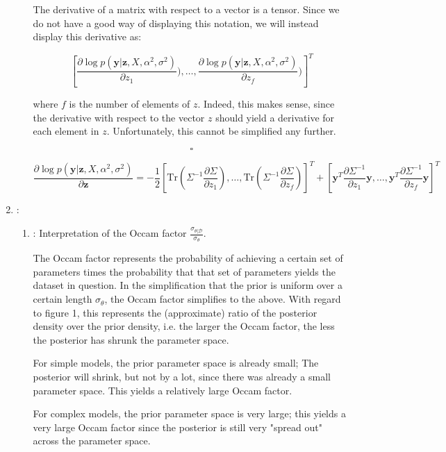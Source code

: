 \documentclass[11pt]{article}
\newcommand{\mbf}[1]{{\boldsymbol{\mathbf{#1}}}}
\renewcommand{\bm}{\mbf}
\newcommand{\Tr}{\textrm{Tr}}
\begin{document}
\begin{enumerate}
\begin{enumerate}[label=(\alph*)]
            The derivative of a matrix with respect to a vector is a tensor. Since we do not have a good way of displaying this notation, we will instead display this derivative as:

            $$
            [\dfrac{\partial \log p(\bm{y}|\bm{z}, X, \alpha^2, \sigma^2)}{\partial z_1}), \dots, \dfrac{\partial \log p(\bm{y}|\bm{z}, X, \alpha^2, \sigma^2)}{\partial z_f})]^T
            $$

            where $f$ is the number of elements of $z$. Indeed, this makes sense, since the derivative with respect to the vector $z$ should yield a derivative for each element in $z$. Unfortunately, this cannot be simplified any further.

            $$\square$$

            $$
            \dfrac{\partial \log p(\bm{y}|\bm{z}, X, \alpha^2, \sigma^2)}{\partial \bm{z}} = - \dfrac{1}{2} [\Tr(\Sigma^{-1} \dfrac{\partial \Sigma}{\partial z_1}), \dots, \Tr(\Sigma^{-1} \dfrac{\partial \Sigma}{\partial z_f})]^T + [\bm{y}^T \dfrac{\partial \Sigma^{-1}}{\partial z_1} \bm{y}, \dots, \bm{y}^T \dfrac{\partial \Sigma^{-1}}{\partial z_f} \bm{y}]^T$$

    \end{enumerate}

    \item:
    \begin{enumerate}[label=(\alph*)]
        \item: Interpretation of the Occam factor $\frac{\sigma_{\theta|\mathcal{D}}}{\sigma_{\theta}}$.

            The Occam factor represents the probability of achieving a certain set of parameters times the probability that that set of parameters yields the dataset in question. In the simplification that the prior is uniform over a certain length $\sigma_{\theta}$, the Occam factor simplifies to the above. With regard to figure 1, this represents the (approximate) ratio of the posterior density over the prior density, i.e. the larger the Occam factor, the less the posterior has shrunk the parameter space.

            For simple models, the prior parameter space is already small; The posterior will shrink, but not by a lot, since there was already a small parameter space. This yields a relatively large Occam factor.

            For complex models, the prior parameter space is very large; this yields a very large Occam factor since the posterior is still very "spread out" across the parameter space.


\end{enumerate}
\end{enumerate}
\end{document}
